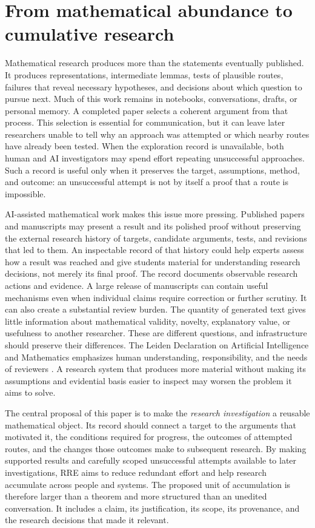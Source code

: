 \section{From mathematical abundance to cumulative research}\label{sec:intro}

Mathematical research produces more than the statements eventually published. It produces representations, intermediate lemmas, tests of plausible routes, failures that reveal necessary hypotheses, and decisions about which question to pursue next. Much of this work remains in notebooks, conversations, drafts, or personal memory. A completed paper selects a coherent argument from that process. This selection is essential for communication, but it can leave later researchers unable to tell why an approach was attempted or which nearby routes have already been tested. When the exploration record is unavailable, both human and AI investigators may spend effort repeating unsuccessful approaches. Such a record is useful only when it preserves the target, assumptions, method, and outcome: an unsuccessful attempt is not by itself a proof that a route is impossible.

AI-assisted mathematical work makes this issue more pressing. Published papers and manuscripts may present a result and its polished proof without preserving the external research history of targets, candidate arguments, tests, and revisions that led to them. An inspectable record of that history could help experts assess how a result was reached and give students material for understanding research decisions, not merely its final proof. The record documents observable research actions and evidence. A large release of manuscripts can contain useful mechanisms even when individual claims require correction or further scrutiny. It can also create a substantial review burden. The quantity of generated text gives little information about mathematical validity, novelty, explanatory value, or usefulness to another researcher. These are different questions, and infrastructure should preserve their differences. The Leiden Declaration on Artificial Intelligence and Mathematics emphasizes human understanding, responsibility, and the needs of reviewers \cite{leiden}. A research system that produces more material without making its assumptions and evidential basis easier to inspect may worsen the problem it aims to solve.

The central proposal of this paper is to make the \emph{research investigation} a reusable mathematical object. Its record should connect a target to the arguments that motivated it, the conditions required for progress, the outcomes of attempted routes, and the changes those outcomes make to subsequent research. By making supported results and carefully scoped unsuccessful attempts available to later investigations, RRE aims to reduce redundant effort and help research accumulate across people and systems. The proposed unit of accumulation is therefore larger than a theorem and more structured than an unedited conversation. It includes a claim, its justification, its scope, its provenance, and the research decisions that made it relevant.

